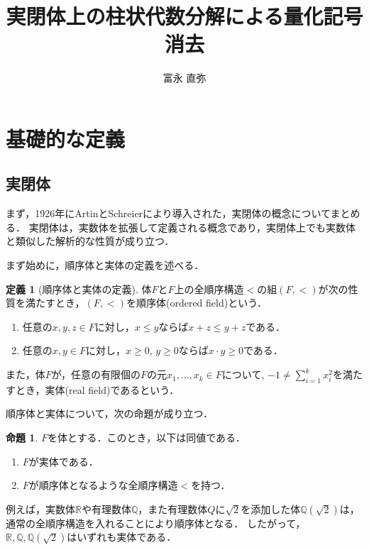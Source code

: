 \documentclass[uplatex, dvipdfmx]{jsarticle}
\newcommand{\R}{\mathbb{R}}
\newcommand{\Q}{\mathbb{Q}}
\theoremstyle{definition}
\newtheorem{definition}{定義}[section]
\newtheorem{proposition}{命題}[section]
\begin{document}
\title{実閉体上の柱状代数分解による量化記号消去}
\author{富永 直弥}
\maketitle

\section{基礎的な定義}

\subsection{実閉体}
まず，1926年にArtinとSchreierにより導入された，実閉体の概念についてまとめる．
実閉体は，実数体を拡張して定義される概念であり，実閉体上でも実数体と類似した解析的な性質が成り立つ．

まず始めに，順序体と実体の定義を述べる．
\begin{definition}[順序体と実体の定義]
     体$F$と$F$上の全順序構造$<$の組$(F,<)$が次の性質を満たすとき，$(F,<)$を順序体(ordered field)という．
     \begin{enumerate}
          \item 任意の$x,y,z\in F$に対し，$x \leq y$ならば$x + z \leq y + z$である．
          \item 任意の$x,y \in F$に対し，$x \geq 0$, $y \geq 0$ならば$x \cdot y \geq 0$である．
     \end{enumerate}

     また，体$F$が，任意の有限個の$F$の元$x_1, \dots, x_k \in F$について, $-1 \neq \sum_{i=1}^k x_i^2$を満たすとき，実体(real field)であるという．
\end{definition}

順序体と実体について，次の命題が成り立つ．

\begin{proposition}
     $F$を体とする．このとき，以下は同値である．
     \begin{enumerate}
          \item $F$が実体である．
          \item $F$が順序体となるような全順序構造$<$を持つ．
     \end{enumerate}
\end{proposition}

例えば，実数体$\R$や有理数体$\Q$，また有理数体$Q$に$\sqrt{2}$を添加した体$\Q(\sqrt{2})$は，
通常の全順序構造を入れることにより順序体となる．
したがって，$\R, \Q, \Q(\sqrt{2})$はいずれも実体である．
\end{document}
